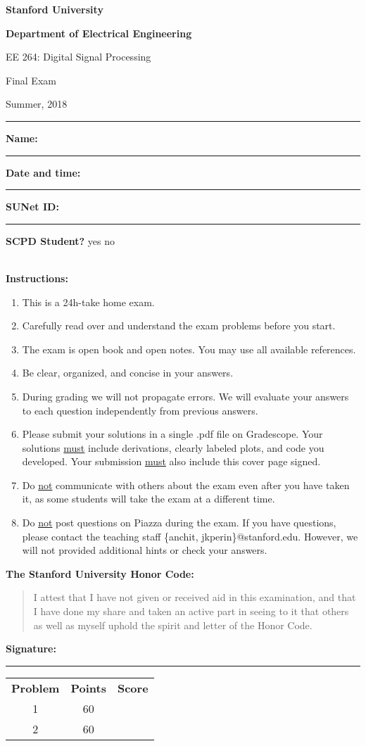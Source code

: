 \doublespacing
\begin{center}
\textbf{\Large Stanford University}

\textbf{\Large Department of Electrical Engineering}

\Large EE 264: Digital Signal Processing 

\Large Final Exam

\Large Summer, 2018
\end{center}
\vspace{-0.5cm}
\rule{\textwidth}{1pt}

\noindent\textbf{Name:} \rule{0.4\textwidth}{0.5pt} \qquad  \textbf{Date and time:} \rule{0.3\textwidth}{0.5pt}

\noindent\textbf{SUNet ID:} \rule{0.3\textwidth}{0.5pt}\qquad 
\textbf{SCPD Student?} yes no

\mbox{}\\
\textbf{Instructions:}
\singlespacing
\begin{enumerate}
\item This is a 24h-take home exam. 
\item Carefully read over and understand the exam problems before you start.
\item The exam is open book and open notes. You may use all available references.
\item Be clear, organized, and concise in your answers.
\item During grading we will not propagate errors. We will evaluate your answers to each question independently from previous answers.
\item Please submit your solutions in a single .pdf file on Gradescope. Your solutions \underline{must} include derivations, clearly labeled plots, and code you developed. Your submission \underline{must} also include this cover page signed. 
\item Do \underline{not} communicate with others about the exam even after you have taken it, as some students will take the exam at a different time.
\item Do \underline{not} post questions on Piazza during the exam. If you have questions, please contact the teaching staff \{anchit, jkperin\}@stanford.edu. However, we will not provided additional hints or check your answers.
\end{enumerate}

\noindent\textbf{The Stanford University Honor Code:}
\begin{quote}
I attest that I have not given or received aid in this examination, and that I have done my share and taken an active part in seeing to it that others as well as myself uphold the spirit and letter of the Honor Code.
\end{quote}
\vspace{1mm}

\begin{center}\textbf{Signature:} \rule{0.7\textwidth}{0.5pt}\end{center}

\doublespacing
\vspace{0.1cm}
\begin{center}
\begin{tabular}{ccc}
\textbf{Problem} & \textbf{Points} & \textbf{Score} \\
1 & 60 & \\
2 & 60 & \\
\end{tabular}
\end{center}
\singlespacing